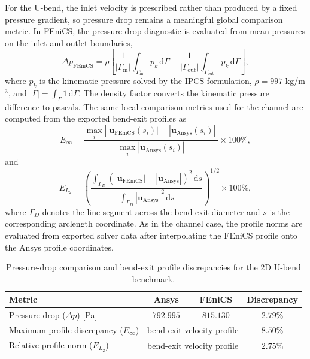 For the U-bend, the inlet velocity is prescribed rather than produced by a fixed pressure gradient, so pressure drop remains a meaningful global comparison metric. In FEniCS, the pressure-drop diagnostic is evaluated from mean pressures on the inlet and outlet boundaries,
\begin{equation}
	\Delta p_{\mathrm{FEniCS}}
	= \rho\left[
	\frac{1}{|\Gamma_{\mathrm{in}}|}\int_{\Gamma_{\mathrm{in}}} p_k \, \mathrm{d}\Gamma
	-
	\frac{1}{|\Gamma_{\mathrm{out}}|}\int_{\Gamma_{\mathrm{out}}} p_k \, \mathrm{d}\Gamma
	\right],
\end{equation}
	where $p_k$ is the kinematic pressure solved by the IPCS formulation, $\rho=997$ kg/m$^3$, and $|\Gamma|=\int_\Gamma 1\,\mathrm{d}\Gamma$. The density factor converts the kinematic pressure difference to pascals. The same local comparison metrics used for the channel are computed from the exported bend-exit profiles as
\begin{equation}
	E_{\infty} =
	\frac{\max_i \left||\mathbf{u}_{\mathrm{FEniCS}}(s_i)|-|\mathbf{u}_{\mathrm{Ansys}}(s_i)|\right|}
	{\max_i |\mathbf{u}_{\mathrm{Ansys}}(s_i)|}\times 100\%,
\end{equation}
and
\begin{equation}
	E_{L_2} =
	\left(
	\frac{\int_{\Gamma_D} \left(|\mathbf{u}_{\mathrm{FEniCS}}|-|\mathbf{u}_{\mathrm{Ansys}}|\right)^2\,\mathrm{d}s}
	{\int_{\Gamma_D} |\mathbf{u}_{\mathrm{Ansys}}|^2\,\mathrm{d}s}
	\right)^{1/2}\times 100\%,
\end{equation}
	where $\Gamma_D$ denotes the line segment across the bend-exit diameter and $s$ is the corresponding arclength coordinate. As in the channel case, the profile norms are evaluated from exported solver data after interpolating the FEniCS profile onto the Ansys profile coordinates.

\begin{table}[!ht]
	\centering
	\footnotesize
		\caption{Pressure-drop comparison and bend-exit profile discrepancies for the 2D U-bend benchmark.}
		\label{tab:ubend_errors}
		\renewcommand{\arraystretch}{1.2}
		\begin{tabularx}{\textwidth}{X c c c}
		\hline
			\textbf{Metric} & \textbf{Ansys} & \textbf{FEniCS} & \textbf{Discrepancy} \\
			\hline
			Pressure drop ($\Delta p$) [Pa] & $792.995$ & $815.130$ & $2.79\%$ \\
			Maximum profile discrepancy ($E_{\infty}$) & \multicolumn{2}{c}{bend-exit velocity profile} & $8.50\%$ \\
			Relative profile norm ($E_{L_2}$) & \multicolumn{2}{c}{bend-exit velocity profile} & $2.75\%$ \\
			\hline
		\end{tabularx}
	\end{table}

